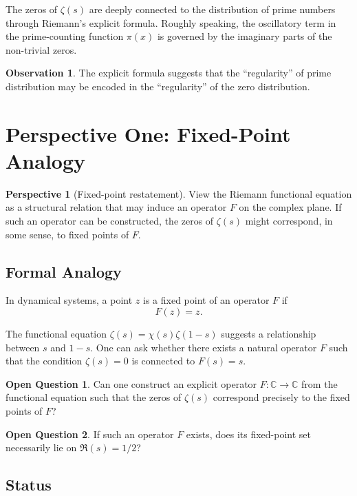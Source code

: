 \documentclass[11pt,a4paper]{article}
\theoremstyle{definition}
\newtheorem{observation}{Observation}[section]
\newtheorem{question}{Open Question}[section]
\newtheorem{perspective}{Perspective}[section]
\begin{document}
The zeros of $\zeta(s)$ are deeply connected to the distribution of prime numbers through Riemann's explicit formula. Roughly speaking, the oscillatory term in the prime-counting function $\pi(x)$ is governed by the imaginary parts of the non-trivial zeros.

\begin{observation}
The explicit formula suggests that the ``regularity'' of prime distribution may be encoded in the ``regularity'' of the zero distribution.
\end{observation}

\section{Perspective One: Fixed-Point Analogy}

\begin{perspective}[Fixed-point restatement]
View the Riemann functional equation as a structural relation that may induce an operator $F$ on the complex plane. If such an operator can be constructed, the zeros of $\zeta(s)$ might correspond, in some sense, to fixed points of $F$.
\end{perspective}

\subsection{Formal Analogy}

In dynamical systems, a point $z$ is a fixed point of an operator $F$ if
\begin{equation}
    F(z) = z.
\end{equation}

The functional equation $\zeta(s) = \chi(s)\zeta(1-s)$ suggests a relationship between $s$ and $1-s$. One can ask whether there exists a natural operator $F$ such that the condition $\zeta(s)=0$ is connected to $F(s)=s$.

\begin{question}
Can one construct an explicit operator $F: \mathbb{C} \to \mathbb{C}$ from the functional equation such that the zeros of $\zeta(s)$ correspond precisely to the fixed points of $F$?
\end{question}

\begin{question}
If such an operator $F$ exists, does its fixed-point set necessarily lie on $\Re(s)=1/2$?
\end{question}

\subsection{Status}
\end{document}
